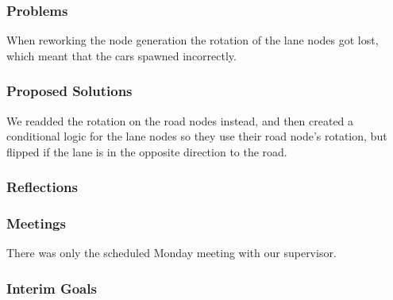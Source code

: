 \subsubsection{Problems}
    When reworking the node generation the rotation of the lane nodes got lost, which meant that the cars spawned incorrectly.

\subsubsection{Proposed Solutions}
    We readded the rotation on the road nodes instead, and then created a conditional logic for the lane nodes so they use their road node's rotation, but flipped if the lane is in the opposite direction to the road.


\subsubsection{Reflections}


\subsubsection{Meetings}

    There was only the scheduled Monday meeting with our supervisor.

\subsubsection{Interim Goals}



